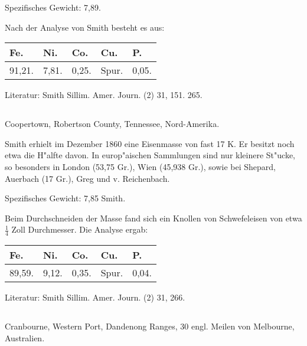 \documentclass[a4paper, 11pt, oneside]{article}
\begin{document}
Spezifisches Gewicht: 7,89.

Nach der Analyse von Smith besteht es aus:
\begin{table}[H]
    \centering\swabfamily\Large
    \begin{tabular}{l l l l l}
        Fe. & Ni. & Co. & Cu. & P. \\ \hline
        91,21. & 7,81. & 0,25. & Spur. & 0,05. \\
    \end{tabular}
\end{table}

\normalsize
Literatur: Smith Sillim. Amer. Journ. (2) 31, 151. 265.

\subsection{}
\LARGE
\paragraph{}
Coopertown, Robertson County, Tennessee, Nord-Amerika.

Smith erhielt im Dezember 1860 eine Eisenmasse von fast 17 K. Er besitzt noch etwa die H"alfte davon. In europ"aischen Sammlungen sind nur kleinere St"ucke, so besonders in London (53,75 Gr.), Wien (45,938 Gr.), sowie bei Shepard, Auerbach (17 Gr.), Greg und v. Reichenbach.

Spezifisches Gewicht: 7,85 Smith.

Beim Durchschneiden der Masse fand sich ein Knollen von Schwefeleisen von etwa $\mathfrak{\frac{1}{4}}$ Zoll Durchmesser. Die Analyse ergab:
\begin{table}[H]
    \centering\swabfamily\Large
    \begin{tabular}{l l l l l}
        Fe. & Ni. & Co. & Cu. & P. \\ \hline
        89,59. & 9,12. & 0,35. & Spur. & 0,04. \\
    \end{tabular}
\end{table}

\normalsize
Literatur: Smith Sillim. Amer. Journ. (2) 31, 266.

\subsection{}
\LARGE
\paragraph{}
Cranbourne, Western Port, Dandenong Ranges, 30 engl. Meilen von Melbourne, Australien.
\end{document}
